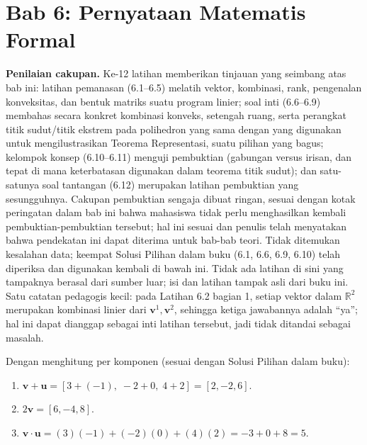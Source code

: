 \section{Bab 6: Pernyataan Matematis Formal}

\textbf{Penilaian cakupan.} Ke-12 latihan memberikan tinjauan yang seimbang atas bab ini: latihan pemanasan (6.1--6.5) melatih vektor, kombinasi, rank, pengenalan konveksitas, dan bentuk matriks suatu program linier; soal inti (6.6--6.9) membahas secara konkret kombinasi konveks, setengah ruang, serta perangkat titik sudut/titik ekstrem pada polihedron yang sama dengan yang digunakan untuk mengilustrasikan Teorema Representasi, suatu pilihan yang bagus; kelompok konsep (6.10--6.11) menguji pembuktian (gabungan versus irisan, dan tepat di mana keterbatasan digunakan dalam teorema titik sudut); dan satu-satunya soal tantangan (6.12) merupakan latihan pembuktian yang sesungguhnya. Cakupan pembuktian sengaja dibuat ringan, sesuai dengan kotak peringatan dalam bab ini bahwa mahasiswa tidak perlu menghasilkan kembali pembuktian-pembuktian tersebut; hal ini sesuai dan penulis telah menyatakan bahwa pendekatan ini dapat diterima untuk bab-bab teori. Tidak ditemukan kesalahan data; keempat Solusi Pilihan dalam buku (6.1, 6.6, 6.9, 6.10) telah diperiksa dan digunakan kembali di bawah ini. Tidak ada latihan di sini yang tampaknya berasal dari sumber luar; isi dan latihan tampak asli dari buku ini. Satu catatan pedagogis kecil: pada Latihan 6.2 bagian 1, setiap vektor dalam $\mathbb{R}^2$ merupakan kombinasi linier dari $\mathbf{v}^1, \mathbf{v}^2$, sehingga ketiga jawabannya adalah “ya”; hal ini dapat dianggap sebagai inti latihan tersebut, jadi tidak ditandai sebagai masalah.

Dengan menghitung per komponen (sesuai dengan Solusi Pilihan dalam buku):
\begin{enumerate}
\item $\mathbf{v} + \mathbf{u} = [3 + (-1),\; -2 + 0,\; 4 + 2] = [2, -2, 6]$.
\item $2\mathbf{v} = [6, -4, 8]$.
\item $\mathbf{v} \cdot \mathbf{u} = (3)(-1) + (-2)(0) + (4)(2) = -3 + 0 + 8 = 5$.
\end{enumerate}


